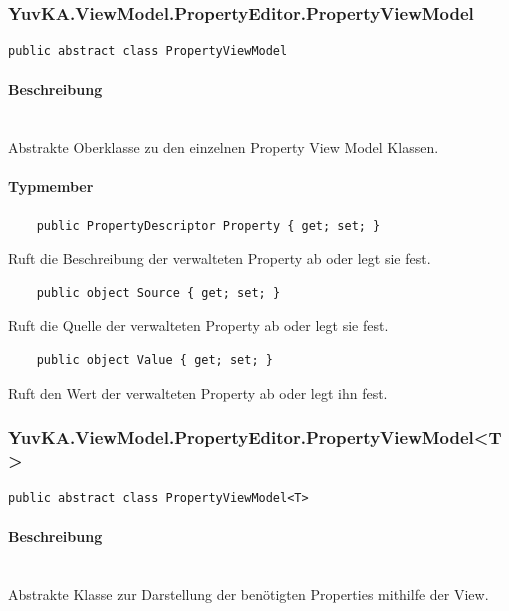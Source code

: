 \subsubsection{YuvKA.ViewModel.PropertyEditor.PropertyViewModel}

\begin{verbatim}
public abstract class PropertyViewModel
\end{verbatim}

\paragraph{Beschreibung}~\\
Abstrakte Oberklasse zu den einzelnen Property View Model Klassen.

\paragraph{Typmember}
\begin{itemize}
 	
	\begin{verbatim}
	public PropertyDescriptor Property { get; set; }
	\end{verbatim}
	Ruft die Beschreibung der verwalteten Property ab oder legt sie fest.

	\begin{verbatim}
	public object Source { get; set; }
	\end{verbatim}
	Ruft die Quelle der verwalteten Property ab oder legt sie fest.

	\begin{verbatim}
	public object Value { get; set; }
	\end{verbatim}
	Ruft den Wert der verwalteten Property ab oder legt ihn fest.

\end{itemize}




\subsubsection{YuvKA.ViewModel.PropertyEditor.PropertyViewModel\textless T\textgreater}

\begin{verbatim}
public abstract class PropertyViewModel<T>
\end{verbatim}

\paragraph{Beschreibung}~\\
Abstrakte Klasse zur Darstellung der benötigten Properties mithilfe der View.

